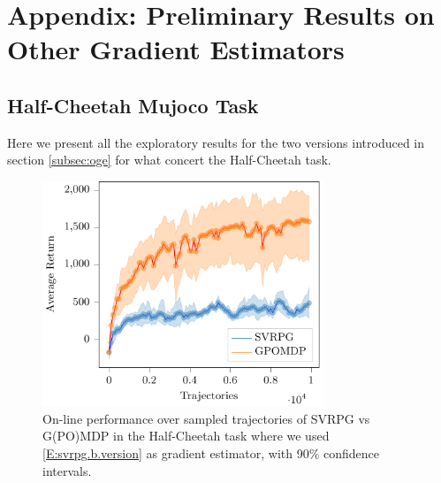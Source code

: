 \chapter{Appendix: Preliminary Results on Other Gradient Estimators}\label{chap:appendix}

\section{Half-Cheetah Mujoco Task}
\vspace{-0.05in}
Here we present all the exploratory results for the two versions introduced in section \ref{subsec:oge} for what concert the Half-Cheetah task.
\begin{figure}[h]
	\begin{minipage}[h]{1\textwidth}
		\centering
		\includegraphics[width=0.75\textwidth]{Images/Experiments/half_cheetah_GPOMDP_vs_NonSelf_SVRPG_B.pdf}
		\vspace{-0.1in}
		\caption{On-line performance over sampled trajectories of \acs{SVRPG} vs G(PO)MDP in the Half-Cheetah task where we used \ref{E:svrpg.b.version} as gradient estimator, with 90\% confidence intervals.}
		\label{fig:hcthree}
	\end{minipage}
	\vspace{-0.15in}
\end{figure}
